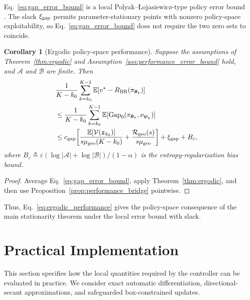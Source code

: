 \documentclass{article}
\newtheorem{corollary}{Corollary}
\theoremstyle{remark}
\newcommand{\E}{\mathbb{E}}
\newcommand{\bz}{\boldsymbol{z}}
\newcommand{\btheta}{\boldsymbol{\theta}}
\newcommand{\bpsi}{\boldsymbol{\psi}}
\newcommand{\Vk}{\mathcal{V}}
\begin{document}
Eq.~\eqref{eq:gap_error_bound} is a local Polyak--\L{}ojasiewicz-type policy error bound \cite{Karimi2016PL}.
The slack $\xi_{\rm gap}$ permits parameter-stationary points with nonzero policy-space exploitability, so Eq.~\eqref{eq:gap_error_bound} does not require the two zero sets to coincide.

\begin{corollary}[Ergodic policy-space performance]\label{cor:ergodic_performance}
Suppose the assumptions of Theorem~\ref{thm:ergodic} and Assumption~\ref{ass:performance_error_bound} hold, and $\mathcal A$ and $\mathcal B$ are finite.
Then
\begin{equation}\label{eq:ergodic_performance}
\begin{aligned}
&\frac{1}{K-k_0}\sum_{k=k_0}^{K-1}
\E[v^\star-R_{\rm BR}(\pi_{\btheta_k})]\\
&\le
\frac{1}{K-k_0}\sum_{k=k_0}^{K-1}
\E[\operatorname{Gap}_0(\pi_{\btheta_k},\nu_{\bpsi_k})]\\
&\le
c_{\rm gap}\!\left[
\frac{\E[\Vk(\bz_{k_0})]}{s\mu_{\rm geo}(K-k_0)}
+\frac{\mathcal R_{\rm geo}(s)}{s\mu_{\rm geo}}
\right]
+\xi_{\rm gap}+B_\varepsilon,
\end{aligned}
\end{equation}
where $B_\varepsilon\triangleq\varepsilon(\log|\mathcal A|+\log|\mathcal B|)/(1-\alpha)$ is the entropy-regularization bias bound.
\end{corollary}
\begin{proof}
Average Eq.~\eqref{eq:gap_error_bound}, apply Theorem~\ref{thm:ergodic}, and then use Proposition~\ref{prop:performance_bridge} pointwise.
\end{proof}

Thus, Eq.~\eqref{eq:ergodic_performance} gives the policy-space consequence of the main stationarity theorem under the local error bound with slack.

\section{Practical Implementation}\label{sec:impl}
This section specifies how the local quantities required by the controller can be evaluated in practice.
We consider exact automatic differentiation, directional-secant approximations, and safeguarded box-constrained updates.
\end{document}
